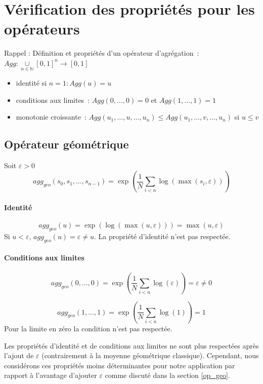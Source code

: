 \section{Vérification des propriétés pour les opérateurs}
Rappel :
Définition et propriétés d'un opérateur d'agrégation : $Agg: \underset{n\in \mathds{N}}{\cup}[0,1]^n\to [0,1]$
\begin{itemize}
    \item identité si $n=1 : Agg(u)=u$
    \item conditions aux limites : $Agg(0,\dots,0)=0$ et $Agg(1,\dots,1)=1$
    \item monotonie croissante : $Agg(u_1,\dots,u,\dots,u_n)\leq Agg(u_1,\dots,v,\dots,u_n)$ si $u \leq v$
\end{itemize}

\subsection{Opérateur géométrique}
Soit $\varepsilon>0$
    \begin{equation}
            agg_{geo}(s_0,s_1,\dots,s_{n-1}) =\exp\left( \frac{1}{N} \sum_{i<n} \log(\max(s_i,\varepsilon ))\right) 
    \end{equation}

\paragraph{Identité}
$$agg_{geo}(u) = \exp(\log(\max(u,\varepsilon))) = \max(u,\varepsilon)$$
Si $u<\varepsilon$, $agg_{geo}(u)=\varepsilon \neq u$. La propriété d'identité n'est pas respectée.

\paragraph{Conditions aux limites}
$$agg_{geo}(0,\dots,0) =\exp\left( \frac{1}{N} \sum_{i<n} \log(\varepsilon)\right) =  \varepsilon\neq 0$$

$$agg_{geo}(1,\dots,1) =\exp\left( \frac{1}{N} \sum_{i<n} \log(1)\right) =  1$$
Pour la limite en zéro la condition n'est pas respectée.

Les propriétés d'identité et de conditions aux limites ne sont plus respectées après l'ajout de $\varepsilon$ (contrairement à la moyenne géométrique classique). Cependant, nous considérons ces propriétés moins déterminantes pour notre application par rapport à l'avantage d'ajouter $\varepsilon$  comme discuté dans la section \ref{op_geo}.

